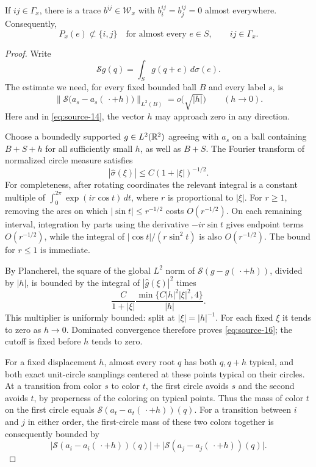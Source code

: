 \begin{lemma}
\label{lem:transitions-avoiding-trace}
If $ij\in\Gamma_x$, there is a trace $b^{ij}\in\mathcal W_x$ with
$b^{ij}_i=b^{ij}_j=0$ almost everywhere.  Consequently,
\begin{equation}
 P_x(e)\not\subset\{i,j\}
 \quad\text{for almost every }e\in S,
 \qquad ij\in\Gamma_x.
 \label{eq:source-15}
\end{equation}
\end{lemma}

\begin{proof}
Write
\[
 \mathcal Sg(q)=\int_S g(q+e)\,d\sigma(e).
\]
The estimate we need, for every fixed bounded ball $B$ and every label
$s$, is
\begin{equation}
 \bigl\|\mathcal S\bigl(a_s-a_s(\,\cdot+h)\bigr)
       \bigr\|_{L^2(B)}=o\bigl(\sqrt{|h|}\bigr)
 \qquad(h\to0).
 \label{eq:source-16}
\end{equation}
Here and in \eqref{eq:source-14}, the vector $h$ may approach zero in any
direction.

Choose a boundedly supported $g\in L^2(\mathbb R^2)$ agreeing with $a_s$ on a
ball containing $B+S+h$ for all sufficiently small $h$, as well as
$B+S$.  The Fourier transform of normalized circle measure satisfies
\[
 |\widehat\sigma(\xi)|\le C(1+|\xi|)^{-1/2}.
\]
For completeness, after rotating coordinates the relevant integral is
a constant multiple of $\int_0^{2\pi}\exp(ir\cos t)\,dt$, where
$r$ is proportional to $|\xi|$.  For $r\ge1$, removing the arcs on
which $|\sin t|\le r^{-1/2}$ costs $O(r^{-1/2})$.  On each remaining
interval, integration by parts using the derivative $-ir\sin t$ gives
endpoint terms $O(r^{-1/2})$, while the integral of
$|\cos t|/(r\sin^2t)$ is also $O(r^{-1/2})$.  The bound for $r\le1$
is immediate.

By Plancherel, the square of the global $L^2$ norm of
$\mathcal S(g-g(\,\cdot+h))$, divided by $|h|$, is bounded by the
integral of $|\widehat g(\xi)|^2$ times
\[
 \frac{C}{1+|\xi|}
       \frac{\min\{C|h|^2|\xi|^2,4\}}{|h|}.
\]
This multiplier is uniformly bounded: split at $|\xi|=|h|^{-1}$.
For each fixed $\xi$ it tends to zero as $h\to0$.  Dominated convergence
therefore proves \eqref{eq:source-16}; the cutoff is fixed before $h$
tends to zero.

For a fixed displacement $h$, almost every root $q$ has both $q,q+h$
typical, and both exact unit-circle samplings centered at these points
typical on their circles.  At a transition from color $s$ to color $t$,
the first circle avoids $s$ and the second avoids $t$, by properness of
the coloring on typical points.  Thus the mass of color $t$ on the
first circle equals
$\mathcal S(a_t-a_t(\,\cdot+h))(q)$.  For a transition between $i$ and
$j$ in either order, the first-circle mass of these two colors together
is consequently bounded by
\[
 \bigl|\mathcal S(a_i-a_i(\,\cdot+h))(q)\bigr|
 +\bigl|\mathcal S(a_j-a_j(\,\cdot+h))(q)\bigr|.
\]


\end{proof}
